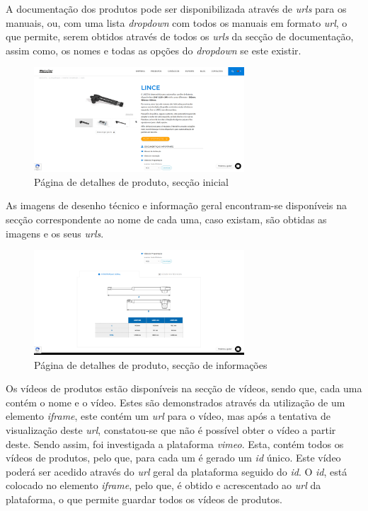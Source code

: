 A documentação dos produtos pode ser disponibilizada através de \textit{urls} para os manuais, ou, com uma lista \textit{dropdown} com todos os manuais em formato \textit{url}, o que permite, serem obtidos através de todos os \textit{urls} da secção de documentação, assim como, os nomes e todas as opções do \textit{dropdown} se este existir.

\begin{figure}[htb]
  \centering
  
  \includegraphics[width=0.7\textwidth]{images/implementacao/scraper/pagina_detalhes_produto.png}
  \caption{Página de detalhes de produto, secção inicial}
  \label{fig:53}
\end{figure}

\newpage

As imagens de desenho técnico e informação geral encontram-se disponíveis na secção correspondente ao nome de cada uma, caso existam, são obtidas as imagens e os seus \textit{urls}.

\begin{figure}[htb]
  \centering
  
  \includegraphics[width=0.7\textwidth]{images/implementacao/scraper/pagina_detalhes_desenhos.png}
  \caption{Página de detalhes de produto, secção de informações}
  \label{fig:54}
\end{figure}

Os vídeos de produtos estão disponíveis na secção de vídeos, sendo que, cada uma contém o nome e o vídeo. Estes são demonstrados através da utilização de um elemento \textit{iframe}, este contém um \textit{url} para o vídeo, mas após a tentativa de visualização deste \textit{url}, constatou-se que não é possível obter o vídeo a partir deste. Sendo assim, foi investigada a plataforma \textit{vimeo}. Esta, contém todos os vídeos de produtos, pelo que, para cada um é gerado um \textit{id} único. Este vídeo poderá ser acedido através do \textit{url} geral da plataforma seguido do \textit{id}. O \textit{id}, está colocado no elemento \textit{iframe}, pelo que, é obtido e acrescentado ao \textit{url} da plataforma, o que permite guardar todos os vídeos de produtos.

